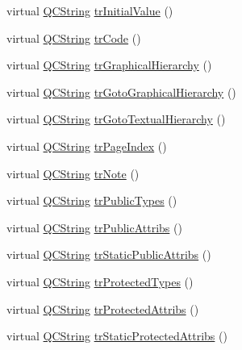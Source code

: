 \begin{DoxyCompactItemize}
\item 
virtual \hyperlink{class_q_c_string}{Q\+C\+String} \hyperlink{class_translator_serbian_cyrillic_a65435f55869fe7b42a85b5165c72bf37}{tr\+Initial\+Value} ()
\item 
virtual \hyperlink{class_q_c_string}{Q\+C\+String} \hyperlink{class_translator_serbian_cyrillic_a2402c7b414a1eb011e56f54b7b54f364}{tr\+Code} ()
\item 
virtual \hyperlink{class_q_c_string}{Q\+C\+String} \hyperlink{class_translator_serbian_cyrillic_a51dbfdf55c565c037d3701409879d3a0}{tr\+Graphical\+Hierarchy} ()
\item 
virtual \hyperlink{class_q_c_string}{Q\+C\+String} \hyperlink{class_translator_serbian_cyrillic_a17126fcf4e081b924b6d39172b354a48}{tr\+Goto\+Graphical\+Hierarchy} ()
\item 
virtual \hyperlink{class_q_c_string}{Q\+C\+String} \hyperlink{class_translator_serbian_cyrillic_ab77024529d00aacffc057f64264c60ef}{tr\+Goto\+Textual\+Hierarchy} ()
\item 
virtual \hyperlink{class_q_c_string}{Q\+C\+String} \hyperlink{class_translator_serbian_cyrillic_a83ccabd0db32637a4e68e5d1a8492692}{tr\+Page\+Index} ()
\item 
virtual \hyperlink{class_q_c_string}{Q\+C\+String} \hyperlink{class_translator_serbian_cyrillic_a3789b1c4d3db07ef193f5c2365b3a2bb}{tr\+Note} ()
\item 
virtual \hyperlink{class_q_c_string}{Q\+C\+String} \hyperlink{class_translator_serbian_cyrillic_a4bed1e32ff052fdeba383b8c50f465ed}{tr\+Public\+Types} ()
\item 
virtual \hyperlink{class_q_c_string}{Q\+C\+String} \hyperlink{class_translator_serbian_cyrillic_af8c09795d0541436c1b5df8e8b9d55d3}{tr\+Public\+Attribs} ()
\item 
virtual \hyperlink{class_q_c_string}{Q\+C\+String} \hyperlink{class_translator_serbian_cyrillic_ab11fdbc7afd435a7d653f7c95ff7cf2d}{tr\+Static\+Public\+Attribs} ()
\item 
virtual \hyperlink{class_q_c_string}{Q\+C\+String} \hyperlink{class_translator_serbian_cyrillic_a8f5c8bd440c3f713e404a63ee3bd9699}{tr\+Protected\+Types} ()
\item 
virtual \hyperlink{class_q_c_string}{Q\+C\+String} \hyperlink{class_translator_serbian_cyrillic_a051e9dc9d4615b046b3aba279ccd5f77}{tr\+Protected\+Attribs} ()
\item 
virtual \hyperlink{class_q_c_string}{Q\+C\+String} \hyperlink{class_translator_serbian_cyrillic_a4c86bd9d7770697396cc21c777fcb624}{tr\+Static\+Protected\+Attribs} ()

\end{DoxyCompactItemize}
